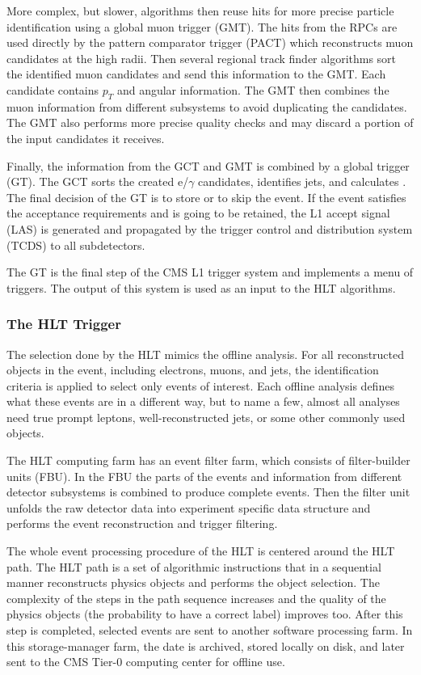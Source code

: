 \begin{normalsize}
More complex, but slower, algorithms then reuse hits for more precise particle identification using a global muon trigger (GMT). The hits from the RPCs are used directly by the pattern comparator trigger (PACT) which reconstructs muon candidates at the high radii. Then several regional track finder algorithms sort the identified muon candidates and send this information to the GMT. Each candidate contains $p_T$ and angular information. The GMT then combines the muon information from different subsystems to avoid duplicating the candidates. The GMT also performs more precise quality checks and may discard a portion of the input candidates it receives. 

Finally, the information from the GCT and GMT is combined by a global trigger (GT). The GCT sorts the created e/$\gamma$ candidates, identifies jets, and calculates \ETslash. The final decision of the GT is to store or to skip the event. If the event satisfies the acceptance requirements and is going to be retained, the L1 accept signal (LAS) is generated and propagated by the trigger control and distribution system (TCDS) to all subdetectors. 


The GT is the final step of the CMS L1 trigger system and implements a menu of triggers. The output of this system is used as an input to the HLT algorithms. 



\subsubsection{The HLT Trigger}

The selection done by the HLT mimics the offline analysis. For all reconstructed objects in the event, including electrons, muons, and jets, the identification criteria is applied to select only events of interest. Each offline analysis defines what these events are in a different way, but to name a few, almost all analyses need true prompt leptons, well-reconstructed jets, or some other commonly used objects. 


The HLT computing farm has an event filter farm, which consists of filter-builder units (FBU). In the FBU the parts of the events and information from different detector subsystems is combined to produce complete events. Then the filter unit unfolds the raw detector data into experiment specific data structure and performs the event reconstruction and trigger filtering. 


The whole event processing procedure of the HLT is centered around the HLT path. The HLT path is a set of algorithmic instructions that in a sequential manner reconstructs physics objects and performs the object selection. The complexity of the steps in the path sequence increases and the quality of the physics objects (the probability to have a correct label) improves too. After this step is completed, selected events are sent to another software processing farm. In this storage-manager farm, the date is archived, stored locally on disk, and later sent to the CMS Tier-0 computing center for offline use. 


\end{normalsize}
